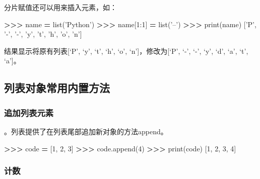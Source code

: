 \documentclass[]{ctexbook}
\newenvironment{Shaded}{\begin{snugshade}}{\end{snugshade}}
\newcommand{\BuiltInTok}[1]{#1}
\newcommand{\DecValTok}[1]{\textcolor[rgb]{0.00,0.00,0.81}{#1}}
\newcommand{\NormalTok}[1]{#1}
\newcommand{\OperatorTok}[1]{\textcolor[rgb]{0.81,0.36,0.00}{\textbf{#1}}}
\newcommand{\StringTok}[1]{\textcolor[rgb]{0.31,0.60,0.02}{#1}}
\begin{document}
分片赋值还可以用来插入元素，如：

\begin{Shaded}
\begin{Highlighting}[]
\OperatorTok{>>>}\NormalTok{ name }\OperatorTok{=} \BuiltInTok{list}\NormalTok{(}\StringTok{'Python'}\NormalTok{)}
\OperatorTok{>>>}\NormalTok{ name[}\DecValTok{1}\NormalTok{:}\DecValTok{1}\NormalTok{] }\OperatorTok{=} \BuiltInTok{list}\NormalTok{(}\StringTok{'--'}\NormalTok{)}
\OperatorTok{>>>} \BuiltInTok{print}\NormalTok{(name)}
\NormalTok{[}\StringTok{'P'}\NormalTok{, }\StringTok{'-'}\NormalTok{, }\StringTok{'-'}\NormalTok{, }\StringTok{'y'}\NormalTok{, }\StringTok{'t'}\NormalTok{, }\StringTok{'h'}\NormalTok{, }\StringTok{'o'}\NormalTok{, }\StringTok{'n'}\NormalTok{]}
\end{Highlighting}
\end{Shaded}

结果显示将原有列表{[}`P', `y', `t', `h', `o', `n'{]}，修改为{[}`P', `-', `-', `y', `d', `a', `t', `a'{]}。

\hypertarget{ux5217ux8868ux5bf9ux8c61ux5e38ux7528ux5185ux7f6eux65b9ux6cd5}{%
\subsection{列表对象常用内置方法}\label{ux5217ux8868ux5bf9ux8c61ux5e38ux7528ux5185ux7f6eux65b9ux6cd5}}

\hypertarget{ux8ffdux52a0ux5217ux8868ux5143ux7d20}{%
\subsubsection{追加列表元素}\label{ux8ffdux52a0ux5217ux8868ux5143ux7d20}}

。列表提供了在列表尾部追加新对象的方法append。

\begin{Shaded}
\begin{Highlighting}[]
\OperatorTok{>>>}\NormalTok{ code }\OperatorTok{=}\NormalTok{ [}\DecValTok{1}\NormalTok{, }\DecValTok{2}\NormalTok{, }\DecValTok{3}\NormalTok{]}
\OperatorTok{>>>}\NormalTok{ code.append(}\DecValTok{4}\NormalTok{)}
\OperatorTok{>>>} \BuiltInTok{print}\NormalTok{(code)}
\NormalTok{[}\DecValTok{1}\NormalTok{, }\DecValTok{2}\NormalTok{, }\DecValTok{3}\NormalTok{, }\DecValTok{4}\NormalTok{]}
\end{Highlighting}
\end{Shaded}

\hypertarget{ux8ba1ux6570}{%
\subsubsection{计数}\label{ux8ba1ux6570}}
\end{document}
